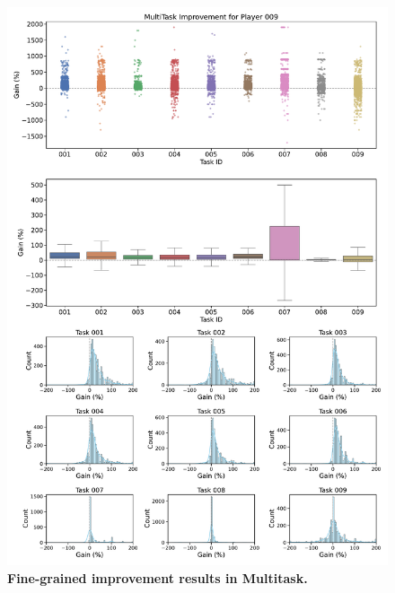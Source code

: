 \begin{figure}[ht]
  \centering
  \includegraphics[width=\textwidth]{figures/gain_validity/multitask/multitask_gain_player_00009.pdf}
  \caption{\textbf{Fine-grained improvement results in Multitask.}}
  \label{fig:multitask_gain_all}
\end{figure}
